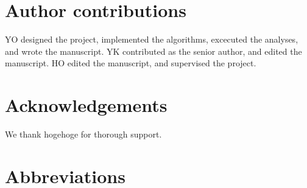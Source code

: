 \documentclass{article}
\begin{document}
\section*{Author contributions}
YO designed the project, implemented the algorithms, excecuted the analyses, and wrote the manuscript. YK 
contributed as the senior author, and edited the manuscript. HO edited the manuscript, and supervised the project.

\section*{Acknowledgements}
We thank hogehoge for thorough support.


\section*{Abbreviations}
\printacronyms[heading=Abbreviations]



\end{document}
